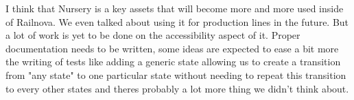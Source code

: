 \documentclass[12pt]{article}
\theoremstyle{definition}
\theoremstyle{definition}
\begin{document}
I think that Nursery is a key assets that will become more and more used inside of Railnova. We even talked about using it for production lines in the future. But a lot of work is yet to be done on the accessibility aspect of it. Proper documentation needs to be written, some ideas are expected to ease a bit more the writing of tests like adding a generic state allowing us to create a transition from "any state" to one particular state without needing to repeat this transition to every other states and theres probably a lot more thing we didn't think about.


\appendix

\end{document}
